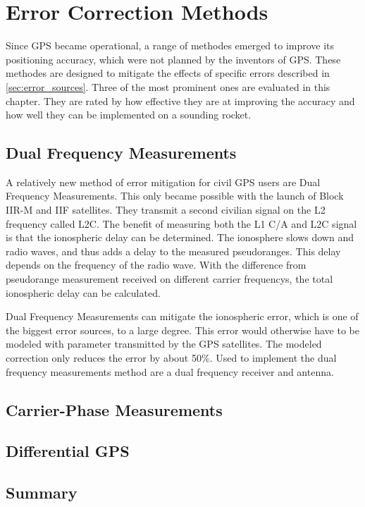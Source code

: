 \chapter{Error Correction Methods}

Since GPS became operational, a range of methodes emerged to improve its positioning accuracy, which were not planned by the inventors of GPS.
These methodes are designed to mitigate the effects of specific errors described in \ref{sec:error_sources}.
Three of the most prominent ones are evaluated in this chapter.
They are rated by how effective they are at improving the accuracy and how well they can be implemented on a sounding rocket.


\section{Dual Frequency Measurements}

A relatively new method of error mitigation for civil GPS users are Dual Frequency Measurements.
This only became possible with the launch of Block IIR-M and IIF satellites.
They transmit a second civilian signal on the L2 frequency called L2C.
The benefit of measuring both the L1 C/A and L2C signal is that the ionospheric delay can be determined.
The ionosphere slows down and radio waves, and thus adds a delay to the measured pseudoranges.
This delay depends on the frequency of the radio wave.
With the difference from pseudorange measurement received on different carrier frequencys, the total ionospheric delay can be calculated.

Dual Frequency Measurements can mitigate the ionospheric error, which is one of the biggest error sources, to a large degree.
This error would otherwise have to be modeled with parameter transmitted by the GPS satellites.
The modeled correction only reduces the error by about 50\%.
Used to implement the dual frequency measurements method are a dual frequency receiver and antenna.


\section{Carrier-Phase Measurements}

\section{Differential GPS}

\section{Summary}